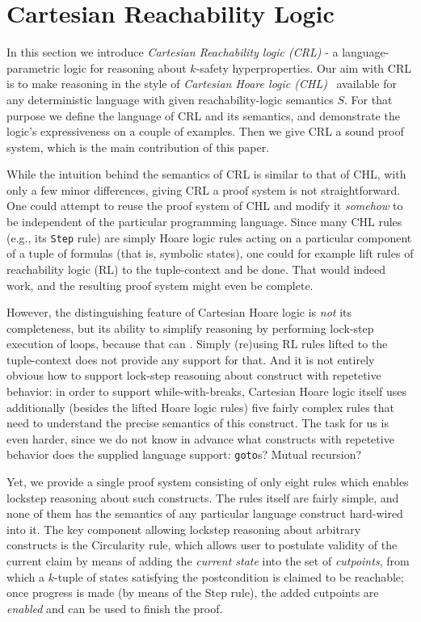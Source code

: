 \section{Cartesian Reachability Logic}
In this section we introduce \emph{Cartesian Reachability logic (CRL)} - a language-parametric logic for reasoning
about $k$-safety hyperproperties.
Our aim with CRL is to make reasoning in the style of \emph{Cartesian Hoare logic (CHL)}~\cite{SousaD16} available for any
deterministic language with given reachability-logic semantics $S$.
For that purpose we define the language of CRL and its semantics, and demonstrate the logic's expressiveness
on a couple of examples.
Then we give CRL a sound proof system, which is the main contribution of this paper.

While the intuition behind the semantics of CRL is similar to that of CHL, with only a few minor differences,
giving CRL a proof system is not straightforward.
One could attempt to reuse the proof system of CHL and modify it \emph{somehow} to be independent
of the particular programming language.
Since many CHL rules (e.g., its \texttt{Step} rule) are simply Hoare logic rules acting on a particular component of
a tuple of formulas (that is, symbolic states),
one could for example lift rules of reachability logic (RL) to the tuple-context and be done.
That would indeed work, and the resulting proof system might even be complete.

However, the distinguishing feature of Cartesian Hoare logic is \emph{not} its completeness,
but its ability to simplify reasoning by performing lock-step execution of loops,
because that can .
Simply (re)using RL rules lifted to the tuple-context does not provide any support for that.
And it is not entirely obvious how to support lock-step reasoning about construct with repetetive behavior:
in order to support while-with-breaks, Cartesian Hoare logic itself uses additionally (besides the lifted Hoare logic rules)
five fairly complex rules that need to understand the precise semantics of this construct.
The task for us is even harder, since we do not know in advance what constructs with repetetive behavior does
the supplied language support: \texttt{goto}s? Mutual recursion? 

Yet, we provide a single proof system consisting of only eight rules which enables lockstep reasoning about such constructs.
The rules itself are fairly simple, and none of them has the semantics of any particular language construct
hard-wired into it.
The key component allowing lockstep reasoning about arbitrary constructs is the Circularity rule,
which allows user to postulate validity of the current claim by means of adding the \emph{current state}
into the set of \emph{cutpoints}, from which a $k$-tuple of states satisfying the postcondition
is claimed to be reachable; once progress is made (by means of the Step rule), the added cutpoints are
\emph{enabled} and can be used to finish the proof.

